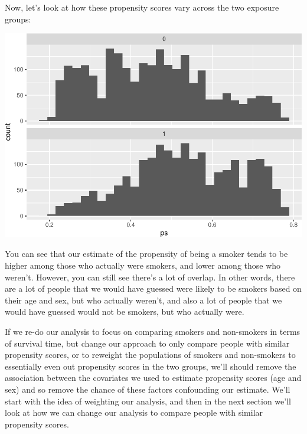 \documentclass[
]{book}
\newenvironment{Shaded}{\begin{snugshade}}{\end{snugshade}}
\newcommand{\DataTypeTok}[1]{\textcolor[rgb]{0.13,0.29,0.53}{#1}}
\newcommand{\DecValTok}[1]{\textcolor[rgb]{0.00,0.00,0.81}{#1}}
\newcommand{\KeywordTok}[1]{\textcolor[rgb]{0.13,0.29,0.53}{\textbf{#1}}}
\newcommand{\NormalTok}[1]{#1}
\newcommand{\OperatorTok}[1]{\textcolor[rgb]{0.81,0.36,0.00}{\textbf{#1}}}
\newcommand{\StringTok}[1]{\textcolor[rgb]{0.31,0.60,0.02}{#1}}
\begin{document}
Now, let's look at how these propensity scores vary across the two exposure groups:

\begin{Shaded}
\end{Shaded}

\includegraphics{adv_epi_analysis_files/figure-latex/unnamed-chunk-258-1.pdf}

You can see that our estimate of the propensity of being a smoker tends to be higher among those who actually were smokers, and lower among those who weren't. However, you can still see there's a lot of overlap. In other words, there are a lot of people that we would have guessed were likely to be smokers based on their age and sex, but who actually weren't, and also a lot of people that we would have guessed would not be smokers, but who actually were.

If we re-do our analysis to focus on comparing smokers and non-smokers in terms of survival time, but change our approach to only compare people with similar propensity scores, or to reweight the populations of smokers and non-smokers to essentially even out propensity scores in the two groups, we'll should remove the association between the covariates we used to estimate propensity scores (age and sex) and so remove the chance of these factors confounding our estimate. We'll start with the idea of weighting our analysis, and then in the next section we'll look at how we can change our analysis to compare people with similar propensity scores.
\end{document}
